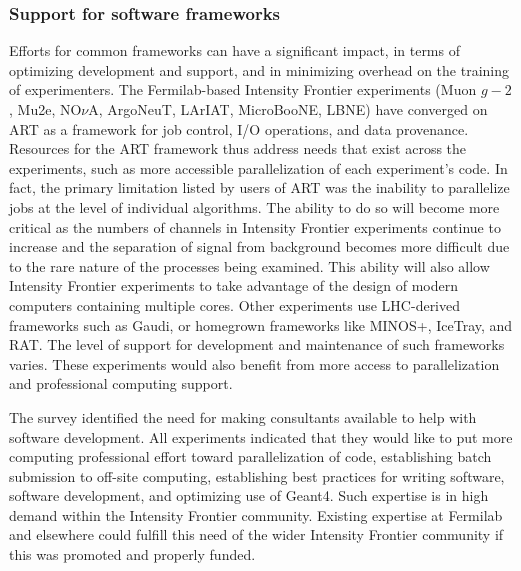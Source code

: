 \subsubsection{Support for software frameworks}
Efforts for common frameworks can have a significant impact, in terms of optimizing  development and support, and in
minimizing overhead on the training of experimenters.  The Fermilab-based Intensity Frontier
experiments (Muon $g-2$, Mu2e, NO$\nu$A, ArgoNeuT, LArIAT, MicroBooNE, LBNE) have
converged on ART as a framework for job control, I/O operations, and data provenance. 
Resources for the ART framework thus address needs that
exist across the experiments, such as more accessible parallelization of each
experiment's code. In fact, the primary limitation listed by users of ART was
the inability to parallelize jobs at the level of individual algorithms.  The
ability to do so will become more critical as the numbers of channels in Intensity Frontier
experiments continue to increase and the separation of signal from background
becomes more difficult due to the rare nature of the processes being examined.
This ability will also allow Intensity Frontier experiments to take advantage of the design of
modern computers containing multiple cores. Other experiments use LHC-derived
frameworks such as Gaudi, or homegrown frameworks like MINOS+, IceTray, and
RAT. The level of support for development and maintenance of such frameworks
varies. These experiments would also benefit from more access to
parallelization and professional computing support.

The survey identified the need for making consultants available to help with
software development. All experiments indicated that they would like to
put more computing professional effort toward parallelization of code,
establishing batch submission to off-site computing, establishing best
practices for writing software, software development, and  optimizing use of
Geant4. Such expertise is in high demand within the Intensity Frontier community. Existing expertise 
at Fermilab and elsewhere could fulfill this need of the
wider Intensity Frontier community if this was promoted and properly funded.

